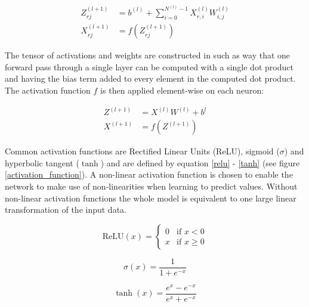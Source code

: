 \documentclass[a4paper,11pt,twoside]{article}
\begin{document}
\begin{align}
Z_{rj}^{(l+1)} & = b^{(l)} + \sum^{N^{(l)}-1}_{i = 0} X^{(l)}_{r,i} W^{(l)}_{i,j}\\
X_{rj}^{(l+1)} & = f(Z_{rj}^{(l+1)})
\end{align}

The tensor of activations and weights are constructed in such as way that one forward pass through a single layer can be computed with a single dot product and having the bias term added to every element in the computed dot product. The activation function $f$ is then applied element-wise on each neuron: \cite{cs231n} \cite{wikiStanford}

\begin{align}
Z^{(l+1)} & = X^{(l)}W^{(l)}+b^{l}\\
X^{(l+1)} & = f(Z^{(l+1)})
\end{align}

Common activation functions are Rectified Linear Units (ReLU), sigmoid ($\sigma$) and hyperbolic tangent ($\tanh$) and are defined by equation \eqref{relu} - \eqref{tanh} (see figure \ref{activation_function}). A non-linear activation function is chosen to enable the network to make use of non-linearities when learning to predict values. Without non-linear activation functions the whole model is equivalent to one large linear transformation of the input data. \cite{cs231n}

\begin{equation}\label{relu}
\mbox{ReLU}{(x)} = \begin{cases} 
			0 & \mbox{if } x < 0 \\ 
			x & \mbox{if } x \geq 0 
		\end{cases}
\end{equation}

\begin{equation}\label{sigmoid}
\sigma(x) = \frac{1}{1+e^{-x}}
\end{equation}

\begin{equation}\label{tanh}
\tanh{(x)} = \frac{e^x-e^{-x}}{e^x+e^{-x}}
\end{equation}
\end{document}
